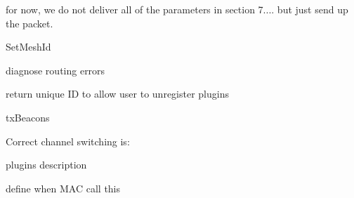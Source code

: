 \begin{DoxyRefList}
\item[\label{todo__todo000070}%
\hypertarget{todo__todo000070}{}%
Member \hyperlink{group__lr-wpan_ga1635d218f83c7d0107b268080efd317b}{ns3\+:\+:Mcps\+Data\+Indication\+Callback} ]for now, we do not deliver all of the parameters in section 7.... but just send up the packet.  
\item[\label{todo__todo000115}%
\hypertarget{todo__todo000115}{}%
Member \hyperlink{classns3_1_1MeshHelper_ac0e3f8f6ae16a79bb09cc25e5c7b8301}{ns3\+:\+:Mesh\+Helper\+:\+:Channel\+Policy} ]Set\+Mesh\+Id  
\item[\label{todo__todo000123}%
\hypertarget{todo__todo000123}{}%
Class \hyperlink{classns3_1_1MeshPointDevice}{ns3\+:\+:Mesh\+Point\+Device} ]
\item[\label{todo__todo000124}%
\hypertarget{todo__todo000124}{}%
Member \hyperlink{classns3_1_1MeshPointDevice_a01489a62c62337339cf7dc8654849964}{ns3\+:\+:Mesh\+Point\+Device\+:\+:Do\+Send} (bool success, \hyperlink{classns3_1_1Ptr}{Ptr$<$ Packet $>$} packet, \hyperlink{classns3_1_1Mac48Address}{Mac48\+Address} src, \hyperlink{classns3_1_1Mac48Address}{Mac48\+Address} dst, uint16\+\_\+t protocol, uint32\+\_\+t iface)]diagnose routing errors  
\item[\label{todo__todo000131}%
\hypertarget{todo__todo000131}{}%
Member \hyperlink{classns3_1_1MeshWifiInterfaceMac_a6902a348d5e717d2a7df28a93416dd9d}{ns3\+:\+:Mesh\+Wifi\+Interface\+Mac\+:\+:Install\+Plugin} (Ptr$<$ Mesh\+Wifi\+Interface\+Mac\+Plugin $>$ plugin)]return unique ID to allow user to unregister plugins  
\item[\label{todo__todo000130}%
\hypertarget{todo__todo000130}{}%
Member \hyperlink{structns3_1_1MeshWifiInterfaceMac_1_1Statistics_aaed87bf29f8a8410d2b7ac521cdd5e84}{ns3\+:\+:Mesh\+Wifi\+Interface\+Mac\+:\+:Statistics\+:\+:Print} (std\+::ostream \&os) const ]tx\+Beacons  
\item[\label{todo__todo000129}%
\hypertarget{todo__todo000129}{}%
Member \hyperlink{classns3_1_1MeshWifiInterfaceMac_a2d850463970dd7f6d477dd0ecf615e2b}{ns3\+:\+:Mesh\+Wifi\+Interface\+Mac\+:\+:Switch\+Frequency\+Channel} (uint16\+\_\+t new\+\_\+id)]Correct channel switching is\+: 
\item[\label{todo__todo000125}%
\hypertarget{todo__todo000125}{}%
Class \hyperlink{classns3_1_1MeshWifiInterfaceMacPlugin}{ns3\+:\+:Mesh\+Wifi\+Interface\+Mac\+Plugin} ]plugins description  
\item[\label{todo__todo000126}%
\hypertarget{todo__todo000126}{}%
Member \hyperlink{classns3_1_1MeshWifiInterfaceMacPlugin_a36279337239f8cbdb31162221e192236}{ns3\+:\+:Mesh\+Wifi\+Interface\+Mac\+Plugin\+:\+:Receive} (\hyperlink{classns3_1_1Ptr}{Ptr$<$ Packet $>$} packet, const \hyperlink{classns3_1_1WifiMacHeader}{Wifi\+Mac\+Header} \&header)=0]define when M\+AC call this  

\end{DoxyRefList}
